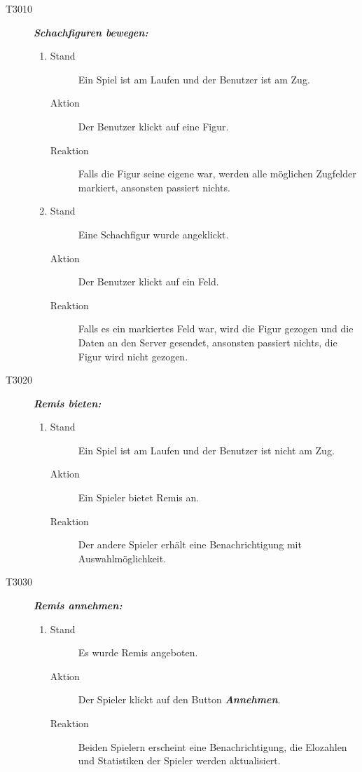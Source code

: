 \documentclass[parskip=full]{scrartcl}
\begin{document}
\begin{description}
	\item[T3010] \textbf{\textit{Schachfiguren bewegen: }} 
	\begin{enumerate}
		\item 
		\begin{description}
			\item[Stand] Ein Spiel ist am Laufen und der Benutzer ist am Zug.
			\item[Aktion] Der Benutzer klickt auf eine  Figur.
			\item[Reaktion] Falls die Figur seine eigene war, werden alle möglichen Zugfelder markiert, ansonsten passiert nichts.
		\end{description}
		\item 
		\begin{description}
			\item[Stand] Eine Schachfigur wurde angeklickt.
			\item[Aktion] Der Benutzer klickt auf ein  Feld.
			\item[Reaktion] Falls es ein markiertes Feld war, wird die Figur gezogen und die Daten an den Server gesendet, ansonsten passiert nichts, die Figur wird nicht gezogen.
		\end{description}
	\end{enumerate}
	
	
	\item[T3020] \textbf{\textit{Remis bieten: }} 
	\begin{enumerate}
		\item 
		\begin{description}
			\item[Stand] Ein Spiel ist am Laufen und der Benutzer ist nicht am Zug.
			\item[Aktion] Ein Spieler bietet Remis an.
			\item[Reaktion] Der andere Spieler erhält eine Benachrichtigung mit Auswahlmöglichkeit.
		\end{description}
	\end{enumerate}
	
	\item[T3030] \textbf{\textit{Remis annehmen: }} 
	\begin{enumerate}
		\item 
		\begin{description}
			\item[Stand] Es wurde Remis angeboten. 
			\item[Aktion] Der Spieler klickt auf den Button \textbf{\textit{Annehmen}}. 
			\item[Reaktion] Beiden Spielern erscheint eine Benachrichtigung, die Elozahlen und Statistiken der Spieler werden aktualisiert.
		\end{description}
	\end{enumerate}
	

\end{description}
\end{document}
